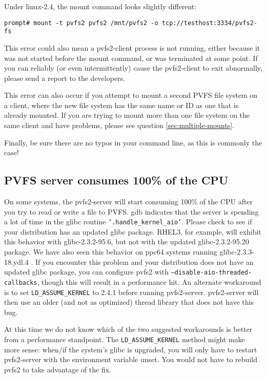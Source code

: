\documentclass[11pt,letterpaper]{article}
\begin{document}
Under linux-2.4, the mount command looks slightly different:
\begin{verbatim}
prompt# mount -t pvfs2 pvfs2 /mnt/pvfs2 -o tcp://testhost:3334/pvfs2-fs
\end{verbatim}

This error could also mean a pvfs2-client process is not running,
either because it was not started before the mount command, or was
terminated at some point. If you can reliably (or even intermittently)
cause the pvfs2-client to exit abnormally, please send a report to the
developers.

This error can also occur if you attempt to mount a second PVFS file system
on a client, where the new file system has the same name or ID as one
that is already mounted.  If you are trying to mount more than one file system
on the same client and have problems, please see question
\ref{sec:multiple-mounts}.

Finally, be sure there are no typos in your command line, as this is
commonly the case!

\subsection{PVFS server consumes 100\% of the CPU}
\label{sec:server_100pct_cpu}

On some systems, the pvfs2-server will start consuming 100\% of the CPU
after you try to read or write a file to PVFS.  gdb indicates that the
server is spending a lot of time in the glibc routine
\texttt{'.handle\_kernel\_aio'}.  Please check to see if your
distribution has an updated glibc package.  RHEL3, for example, will
exhibit this behavior with glibc-2.3.2-95.6, but not with the updated
glibc-2.3.2-95.20 package.  We have also seen this behavior on ppc64
systems running glibc-2.3.3-18.ydl.4 .  If you encounter this problem
and your distribution does not have an updated glibc package, you can
configure pvfs2 with \texttt{--disable-aio-threaded-callbacks}, though
this will result in a performance hit.  An alternate workaround is to
set \texttt{LD\_ASSUME\_KERNEL} to 2.4.1 before running pvfs2-server.
pvfs2-server will then use an older (and not as optimized) thread
library that does not have this bug.

At this time we do not know which of the two suggested workarounds is
better from a performance standpoint.  The \texttt{LD\_ASSUME\_KERNEL}
method might make more sense:  when/if the system's glibc is
upgraded, you will only have to restart pvfs2-server with the
environment variable unset.  You would not have to rebuild pvfs2 to take
advantage of the fix.
\end{document}
